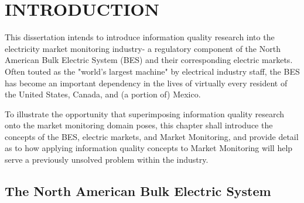%
%
%
%  
%



\pagestyle{plain} %
\setcounter{page}{1}


\chapter{\uppercase {Introduction}}
\label{cha:Introduction}
This dissertation intends to introduce information quality research into the electricity market monitoring industry- a regulatory component of the North American Bulk Electric System (BES) \cite{ferc1} and their corresponding electric markets. Often touted as the "world's largest machine" \cite{stenvignils} by electrical industry staff, the BES has become an important dependency in the lives of virtually every resident of the United States, Canada, and (a portion of) Mexico.

To illustrate the opportunity that superimposing information quality research onto the market monitoring domain poses, this chapter shall introduce the concepts of the BES, electric markets, and Market Monitoring, and provide detail as to how applying information quality concepts to Market Monitoring will help serve a previously unsolved problem within the industry.

\section{The North American Bulk Electric System}

